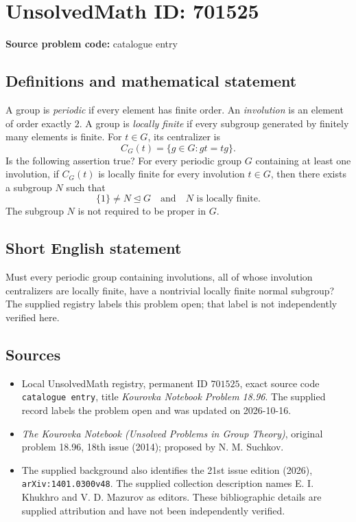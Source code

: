 \documentclass[11pt]{article}
\begin{document}
\section*{UnsolvedMath ID: 701525}
\textbf{Source problem code:} catalogue entry
\subsection{Definitions and mathematical statement}
A group is \emph{periodic} if every element has finite order. An \emph{involution} is an element of order exactly \(2\). A group is \emph{locally finite} if every subgroup generated by finitely many elements is finite. For \(t\in G\), its centralizer is
\[
C_G(t)=\{g\in G:gt=tg\}.
\]
Is the following assertion true? For every periodic group \(G\) containing at least one involution, if \(C_G(t)\) is locally finite for every involution \(t\in G\), then there exists a subgroup \(N\) such that
\[
\{1\}\ne N\trianglelefteq G
\quad\text{and}\quad N\text{ is locally finite}.
\]
The subgroup \(N\) is not required to be proper in \(G\).
\subsection{Short English statement}
Must every periodic group containing involutions, all of whose involution centralizers are locally finite, have a nontrivial locally finite normal subgroup? The supplied registry labels this problem open; that label is not independently verified here.
\subsection{Sources}
\begin{itemize}
\item Local UnsolvedMath registry, permanent ID \(701525\), exact source code \texttt{catalogue entry}, title \emph{Kourovka Notebook Problem 18.96}. The supplied record labels the problem open and was updated on 2026-10-16.
\item \emph{The Kourovka Notebook (Unsolved Problems in Group Theory)}, original problem 18.96, 18th issue (2014); proposed by N. M. Suchkov.
\item The supplied background also identifies the 21st issue edition (2026), \texttt{arXiv:1401.0300v48}. The supplied collection description names E. I. Khukhro and V. D. Mazurov as editors. These bibliographic details are supplied attribution and have not been independently verified.
\end{itemize}
\end{document}
